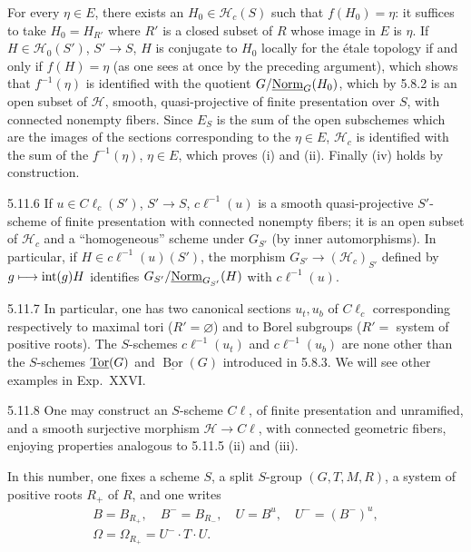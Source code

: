 For every $\eta\in E$, there exists an $H_0\in\mathscr H_c(S)$ such that $f(H_0)=\eta$: it suffices to take $H_0=H_{R'}$ where $R'$ is a closed subset of $R$ whose image in $E$ is $\eta$. If $H\in\mathscr H_0(S')$, $S'\to S$, $H$ is conjugate to $H_0$ locally for the \'etale topology if and only if $f(H)=\eta$ (as one sees at once by the preceding argument), which shows that $f^{-1}(\eta)$ is identified with the quotient $G/\underline{\mathrm{Norm}}_G(H_0)$, which by 5.8.2 is an open subset of $\mathscr H$, smooth, quasi-projective of finite presentation over $S$, with connected nonempty fibers. Since $E_S$ is the sum of the open subschemes which are the images of the sections corresponding to the $\eta\in E$, $\mathscr H_c$ is identified with the sum of the $f^{-1}(\eta)$, $\eta\in E$, which proves (i) and (ii). Finally (iv) holds by construction.
\begin{corollary}{5.11.6}\label{XXII.5.11.6}
If $u\in C\ell_c(S')$, $S'\to S$, $c\ell^{-1}(u)$ is a smooth quasi-projective $S'$-scheme of finite presentation with connected nonempty fibers; it is an open subset of $\mathscr H_c$ and a ``homogeneous'' scheme under $G_{S'}$ (by inner automorphisms). In particular, if $H\in c\ell^{-1}(u)(S')$, the morphism $G_{S'}\to(\mathscr H_c)_{S'}$ defined by $g\longmapsto\operatorname{int}(g)H$ identifies $G_{S'}/\underline{\mathrm{Norm}}_{G_{S'}}(H)$ with $c\ell^{-1}(u)$.
\end{corollary}
\begin{examples}{5.11.7}\label{XXII.5.11.7}
In particular, one has two canonical sections $u_t,u_b$ of $C\ell_c$ corresponding respectively to maximal tori ($R'=\varnothing$) and to Borel subgroups ($R'=$ system of positive roots). The $S$-schemes $c\ell^{-1}(u_t)$ and $c\ell^{-1}(u_b)$ are none other than the $S$-schemes $\underline{\operatorname{Tor}}(G)$ and $\underline{\operatorname{Bor}}(G)$ introduced in 5.8.3. We will see other examples in Exp.~XXVI.
\end{examples}
\begin{remark}{5.11.8}\label{XXII.5.11.8}
One may construct an $S$-scheme $C\ell$, of finite presentation and unramified, and a smooth surjective morphism $\mathscr H\to C\ell$, with connected geometric fibers, enjoying properties analogous to 5.11.5 (ii) and (iii).
\end{remark}

\label{XXII.sec.6}
In this number, one fixes a scheme $S$, a split $S$-group $(G,T,M,R)$, a system of positive roots $R_+$ of $R$, and one writes
\[
\begin{gathered}
B=B_{R_+},\quad B^-=B_{R_-},\quad U=B^u,\quad U^-=(B^-)^u,\\
\Omega=\Omega_{R_+}=U^-\cdot T\cdot U.
\end{gathered}
\]
